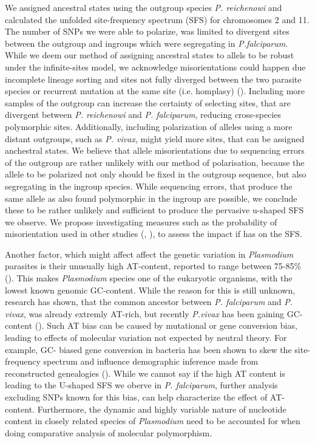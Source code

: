 \documentclass[11pt]{article}
\begin{document}
We assigned ancestral states using the outgroup species \emph{P. reichenowi} and calculated the unfolded site-frequency spectrum (SFS) for chromosomes 2 and 11. The number of SNPs we were able to polarize, was limited to divergent sites between the outgroup and ingroups which were segregating in \emph{P.falciparum}.  While we deem our method of assigning ancestral states to allels to be robust under the infinite-sites model, we acknowledge misorientations could happen due incomplete lineage sorting and sites not fully diverged between the two parasite species or recurrent mutation at the same site (i.e. homplasy) (\cite{baudry-2003-effec-misor}). Including more samples of the outgroup can increase the certainty of selecting sites, that are divergent between \emph{P. reichenowi} and \emph{P. falciparum}, reducing cross-species polymorphic sites. Additionally, including polarization of alleles using a more distant outgroups, such as \emph{P. vivax}, might yield more sites, that can be assigned anchestral states. We believe that allele misorientations due to sequencing errors of the outgroup are rather unlikely with our method of polarisation, because the allele to be polarized not only should be fixed in the outgroup sequence, but also segregating in the ingroup species. While sequencing errors, that produce the same allele as also found polymorphic in the ingroup are possible, we conclude these to be rather unlikely and sufficient to produce the pervasive u-shaped SFS we observe. We propose investigating measures such as the probability of misorientation used in other studies (\cite{baudry-2003-effec-misor}, \cite{fay-2000-hitch-under} ), to assess the impact if has on the SFS.

Another factor, which might affect affect the genetic variation in \emph{Plasmodium} parasites is their unusually high AT-content, reported to range between 75-85\% (\cite{videvall-2018-plasm-paras}). This makes \emph{Plasmodium} species one of the eukaryotic organisms, with the lowest known genomic GC-content. While the reason for this is still unknown, research has shown, that the common ancestor between \emph{P. falciparum} and \emph{P. vivax}, was already extremly AT-rich, but recently \emph{P.vivax} has been gaining GC-content (\cite{nikbakht-2014-evolut-genom}). Such AT bias can be caused by mutational or gene conversion bias, leading to effects of molecular variation not expected by neutral theory. For example, GC- biased gene conversion in bacteria has been shown to skew the site-frequency spectrum and influence demographic inference made from reconstructed genealogies (\cite{lapierre-2016-impac-selec}). While we cannot say if the high AT content is leading to the U-shaped SFS we oberve in \emph{P. falciparum}, further analysis excluding SNPs known for this bias, can help characterize the effect of AT-content. Furthermore, the dynamic and highly variable nature of nucleotide content in closely related species of \emph{Plasmodium} need to be accounted for when doing comparative analysis of molecular polymorphism.
\end{document}
